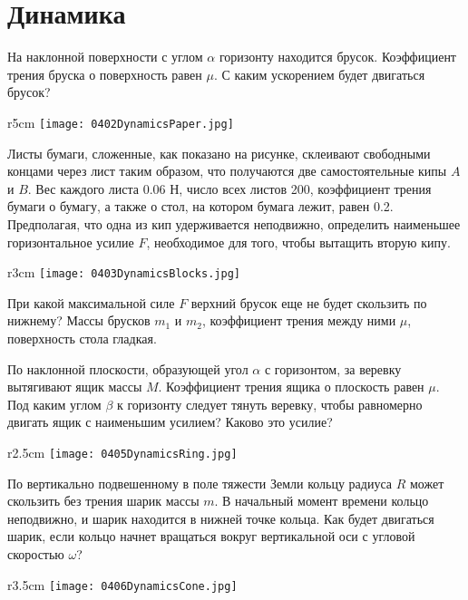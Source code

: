 \section{Динамика}

\AddProb На наклонной поверхности с углом $\alpha$ горизонту находится брусок. 
Коэффициент трения бруска о поверхность равен $\mu$. С каким ускорением будет двигаться брусок?

\begin{wrapfigure}{r}{5cm}
\texttt{[image: 0402DynamicsPaper.jpg]}
\end{wrapfigure}

\AddProb Листы бумаги, сложенные, как показано на рисунке, склеивают свободными концами через лист таким образом, 
что получаются две самостоятельные кипы $A$ и $B$. Вес каждого листа 0.06 Н, число всех листов 200, коэффициент трения бумаги о бумагу, 
а также о стол, на котором бумага лежит, равен 0.2. Предполагая, что одна из кип удерживается неподвижно, 
определить наименьшее горизонтальное усилие $F$, необходимое для того, чтобы вытащить вторую кипу.

\begin{wrapfigure}{r}{3cm}
\texttt{[image: 0403DynamicsBlocks.jpg]}
\end{wrapfigure}

\AddProb При какой максимальной силе $F$ верхний брусок еще не будет скользить по нижнему? 
Массы брусков $m_1$ и $m_2$, коэффициент трения между ними $\mu$, поверхность стола гладкая.

\AddProb По наклонной плоскости, образующей угол $\alpha$ с горизонтом, за веревку вытягивают ящик массы $M$. 
Коэффициент трения ящика о плоскость равен $\mu$. Под каким углом $\beta$ к горизонту следует тянуть веревку, 
чтобы равномерно двигать ящик с наименьшим усилием? Каково это усилие?

\begin{wrapfigure}{r}{2.5cm}
\texttt{[image: 0405DynamicsRing.jpg]}
\end{wrapfigure}

\AddProb По вертикально подвешенному в поле тяжести Земли кольцу радиуса $R$ может скользить без трения шарик массы $m$. 
В начальный момент времени кольцо неподвижно, и шарик находится в нижней точке кольца. 
Как будет двигаться шарик, если кольцо начнет вращаться вокруг вертикальной оси с угловой скоростью $\omega$?

\begin{wrapfigure}{r}{3.5cm}
\texttt{[image: 0406DynamicsCone.jpg]}
\end{wrapfigure}

